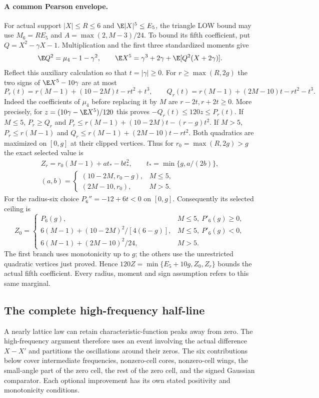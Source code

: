 \paragraph{A common Pearson envelope.}\label{j:fourier:pearson-envelope}
For actual support $|X|\le R\le6$ and $\E|X|^5\le E_5$, the
triangle LOW bound may use $M_6=RE_5$ and $A=\max(2,M-3)/24$.
To bound its fifth coefficient, put $Q=X^2-\gamma X-1$. Multiplication
and the first three standardized moments give
\[
 \E Q^2=\mu_4-1-\gamma^2,\qquad
 \E X^5=\gamma^3+2\gamma+\E[Q^2(X+2\gamma)].
\]
Reflect this auxiliary calculation so that $t=|\gamma|\ge0$.
For $r\ge\max(R,2g)$ the two signs of $\E X^5-10\gamma$ are at most
\[
 P_r(t)=r(M-1)+(10-2M)t-rt^2+t^3,
 \qquad Q_r(t)=r(M-1)+(2M-10)t-rt^2-t^3.
\]
Indeed the coefficients of $\mu_4$ before replacing it by $M$ are
$r-2t,r+2t\ge0$. More precisely, for
$z=(10\gamma-\E X^5)/120$ this proves $-Q_r(t)\le120z\le P_r(t)$.
If $M\le5$, $P_r\ge Q_r$ and
$P_r\le r(M-1)+(10-2M)t-(r-g)t^2$.
If $M>5$, $P_r\le r(M-1)$ and
$Q_r\le r(M-1)+(2M-10)t-rt^2$.
Both quadratics are maximized on $[0,g]$ at their clipped vertices.
Thus for $r_0=\max(R,2g)>g$ the exact selected value is
\begin{gather*}
 Z_r=r_0(M-1)+a t_*-b t_*^2,\qquad
 t_*=\min\{g,a/(2b)\},\\
 (a,b)=\begin{cases}(10-2M,r_0-g),&M\le5,\\
                    (2M-10,r_0),&M>5.
       \end{cases}
\end{gather*}
For the radius-six choice $P_6''=-12+6t<0$ on $[0,g]$.
Consequently its selected ceiling is
\[
 Z_0=\begin{cases}
 P_6(g),&M\le5,\ P'_6(g)\ge0,\\
 6(M-1)+(10-2M)^2/[4(6-g)],&M\le5,\ P'_6(g)<0,\\
 6(M-1)+(2M-10)^2/24,&M>5.
 \end{cases}
\]
The first branch uses monotonicity up to $g$; the others use the
unrestricted quadratic vertices just proved. Hence
$120Z=\min\{E_5+10g,Z_0,Z_r\}$ bounds the actual fifth coefficient.
Every radius, moment and sign assumption refers to this same marginal.

\subsection{The complete high-frequency half-line}

A nearly lattice law can retain characteristic-function peaks away from
zero. The high-frequency argument therefore uses an event involving the
actual difference $X-X'$ and partitions the oscillations around their
zeros. The six contributions below cover intermediate frequencies,
nonzero-cell cores, nonzero-cell wings, the small-angle part of the zero
cell, the rest of the zero cell, and the signed Gaussian comparator.
Each optional improvement has its own stated positivity and monotonicity
conditions.

